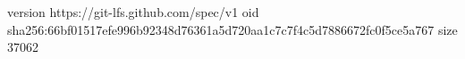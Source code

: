 version https://git-lfs.github.com/spec/v1
oid sha256:66bf01517efe996b92348d76361a5d720aa1c7c7f4c5d7886672fc0f5ce5a767
size 37062
